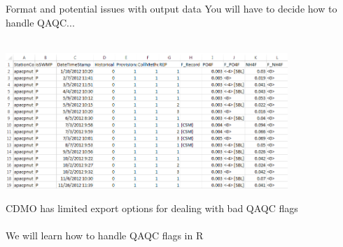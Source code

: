 \documentclass[xcolor=svgnames]{beamer}\usepackage[]{graphicx}\usepackage[]{color}
\begin{document}
\begin{frame}{Format and potential issues with output data}
You will have to decide how to handle QAQC...\\~\\
\centerline{\includegraphics[width = 0.8\textwidth]{qaqc_ex.png}}
\vspace{0.2in}
CDMO has limited export options for dealing with bad QAQC flags \\~\\
We will learn how to handle QAQC flags in R
\end{frame}
\end{document}
